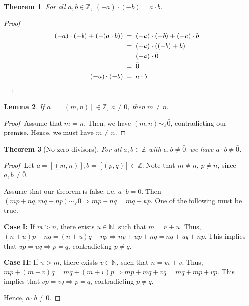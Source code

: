 \documentclass[10pt]{article}
\newtheorem{theorem}{Theorem}[section]
\newtheorem{lemma}[theorem]{Lemma}
\theoremstyle{definition}
\theoremstyle{remark}
\begin{document}
        \begin{theorem}
                For all $a, b \in \mathbb{Z}$, $(-a)\cdot(-b) = a\cdot b$.
        \end{theorem}
        \begin{proof}
                \begin{align*}
                        (-a)\cdot(-b) + (-(a\cdot b)) \;&=\; (-a)\cdot(-b) + (-a)\cdot b\\
                                \;&=\; (-a)\cdot((-b) + b) \\
                                \;&=\; (-a)\cdot \bar{0} \\
                                \;&=\; \bar{0}\\
                        (-a)\cdot(-b) \;&=\; a\cdot b \qedhere
                \end{align*}
        \end{proof}

        \begin{lemma}
                If $a = [(m, n)] \in \mathbb{Z}$, $a \neq \bar{0}$, then $m \neq n$.
        \end{lemma}
        \begin{proof}
                Assume that $m = n$. Then, we have $(m, n) \sim_{\mathbb{Z}} \bar{0}$,
                contradicting our premise. Hence, we must have $m\neq n$.
        \end{proof}
        \begin{theorem}[No zero divisors]
                For all $a, b \in \mathbb{Z}$ with $a,b \neq \bar{0}$, we have $a\cdot b \neq \bar{0}$.
        \end{theorem}
        \begin{proof}
                Let $a = [(m, n)], b = [(p, q)] \in \mathbb{Z}$.
                Note that $m\neq n$, $p\neq n$, since $a, b \neq \bar{0}$.

                Assume that our theorem is false, i.e. $a\cdot b = \bar{0}$.
                Then $(mp + nq, mq + np) \sim_{\mathbb{Z}} \bar{0} \Rightarrow mp + nq = mq + np$.
                One of the following must be true.
                
                \par\textbf{Case I:} If $m > n$, there exists $u \in \mathbb{N}$, such that $m = n + u$. Thus, $(n + u)p + nq = (n + u)q + np \Rightarrow np + up + nq = nq + uq + np$.
                This implies that $up = uq \Rightarrow p = q$, contradicting $p\neq q$.
                \par\textbf{Case II:} If $n > m$, there exists $v \in \mathbb{N}$, such that $n = m + v$. Thus, $mp + (m + v)q = mq + (m + v)p\Rightarrow mp + mq + vq = mq + mp + vp$.
                This implies that $vp = vq \Rightarrow p = q$, contradicting $p\neq q$.

                Hence, $a\cdot b \neq \bar{0}$.
        \end{proof}
\end{document}
